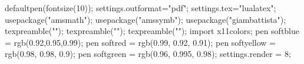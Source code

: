 
\begin{asydef} 
defaultpen(fontsize(10));
settings.outformat="pdf";
settings.tex="lualatex";
usepackage("amsmath");
usepackage("amssymb"); 
usepackage("giambattista");
texpreamble("\renewcommand{\vec}[1]{\mathbf{#1}}");
texpreamble("\let\e\relax");
texpreamble("\DeclareMathOperator{\e}{e}"); 
import x11colors;
pen softblue = rgb(0.92,0.95,0.99);
pen softred = rgb(0.99, 0.92, 0.91);
pen softyellow = rgb(0.98, 0.98, 0.9);
pen softgreen = rgb(0.96, 0.995, 0.98);
settings.render = 8; 
\end{asydef}

\newsavebox{\asybox}
\def\asydir{asy3d}

\makeatletter                       
\def\printauthor{%
  {\large \@author}}              
\makeatother

\author{\Large \textit{Samuel S.\ Watson}}

\newcommand{\milink}[3][-7.5mm]{\sidenote{\href{http://mathinsight.org/#2}{\mi} on #3}[#1]}
\newcommand\cocalc[1][-2pt]{\raisebox{#1}{\texttt{[image: figures/cocalc\_new]}}}
\newcommand\tbob[1][-2pt]{\raisebox{#1}{\texttt{[image: figures/3b1b\_new]}}}
\newcommand\mi[1][-2pt]{\raisebox{#1}{\texttt{[image: figures/mathinsight]}}}



\usetikzlibrary{decorations.fractals}

